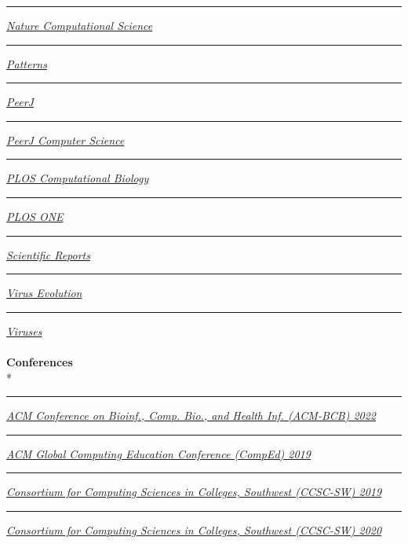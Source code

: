 \documentclass[margin,line]{res}
\begin{document}
\begin{resume}
\rule{-1mm}{5mm} \hspace*{4mm} \href{https://www.nature.com/natcomputsci}{\textit{Nature Computational Science}}\\
\rule{-1mm}{5mm} \hspace*{4mm} \href{https://www.cell.com/patterns}{\textit{Patterns}}\\
\rule{-1mm}{5mm} \hspace*{4mm} \href{https://peerj.com/}{\textit{PeerJ}}\\
\rule{-1mm}{5mm} \hspace*{4mm} \href{https://peerj.com/computer-science/}{\textit{PeerJ Computer Science}}\\
\rule{-1mm}{5mm} \hspace*{4mm} \href{https://journals.plos.org/ploscompbiol/}{\textit{PLOS Computational Biology}}\\
\rule{-1mm}{5mm} \hspace*{4mm} \href{https://journals.plos.org/plosone/}{\textit{PLOS ONE}}\\
\rule{-1mm}{5mm} \hspace*{4mm} \href{https://www.nature.com/srep/}{\textit{Scientific Reports}}\\
\rule{-1mm}{5mm} \hspace*{4mm} \href{https://academic.oup.com/ve}{\textit{Virus Evolution}}\\
\rule{-1mm}{5mm} \hspace*{4mm} \href{https://www.mdpi.com/journal/viruses}{\textit{Viruses}}\\
~\\
\textbf{Conferences}\\*
\rule{-1mm}{5mm} \hspace*{4mm} \href{https://acm-bcb.org/2022}{\textit{ACM Conference on Bioinf., Comp. Bio., and Health Inf. (ACM-BCB) 2022}}\\
\rule{-1mm}{5mm} \hspace*{4mm} \href{http://www.acmcomped.org/}{\textit{ACM Global Computing Education Conference (CompEd) 2019}}\\
\rule{-1mm}{5mm} \hspace*{4mm} \href{http://www.ccsc.org/southwestern/2019/index.php}{\textit{Consortium for Computing Sciences in Colleges, Southwest (CCSC-SW) 2019}}\\
\rule{-1mm}{5mm} \hspace*{4mm} \href{http://www.ccsc.org/southwestern/2020/index.php}{\textit{Consortium for Computing Sciences in Colleges, Southwest (CCSC-SW) 2020}}\\

\end{resume}
\end{document}
